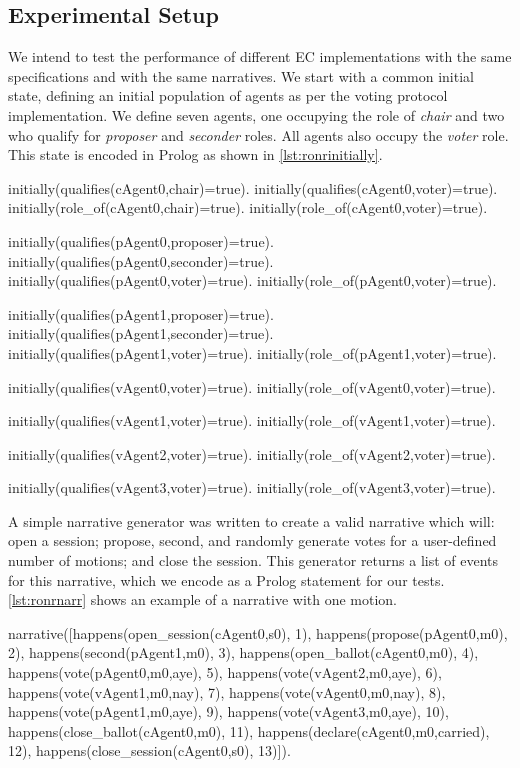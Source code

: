\subsection{Experimental Setup}

We intend to test the performance of different \ac{EC} implementations
with the same specifications and with the same narratives. We start with a
common initial state, defining an initial population of agents as per the voting protocol
implementation. We define seven agents, one occupying the role of \emph{chair}
and two who qualify for \emph{proposer} and \emph{seconder} roles. All agents
also occupy the \emph{voter} role. This state is encoded in Prolog as shown in
\autoref{lst:ronrinitially}.

\begin{prolog}[caption=Initial state of voting protocol in Prolog,label=lst:ronrinitially]
initially(qualifies(cAgent0,chair)=true).
initially(qualifies(cAgent0,voter)=true).
initially(role_of(cAgent0,chair)=true).
initially(role_of(cAgent0,voter)=true).

initially(qualifies(pAgent0,proposer)=true).
initially(qualifies(pAgent0,seconder)=true).
initially(qualifies(pAgent0,voter)=true).
initially(role_of(pAgent0,voter)=true).

initially(qualifies(pAgent1,proposer)=true).
initially(qualifies(pAgent1,seconder)=true).
initially(qualifies(pAgent1,voter)=true).
initially(role_of(pAgent1,voter)=true).

initially(qualifies(vAgent0,voter)=true).
initially(role_of(vAgent0,voter)=true).

initially(qualifies(vAgent1,voter)=true).
initially(role_of(vAgent1,voter)=true).

initially(qualifies(vAgent2,voter)=true).
initially(role_of(vAgent2,voter)=true).

initially(qualifies(vAgent3,voter)=true).
initially(role_of(vAgent3,voter)=true).
\end{prolog}

A simple narrative generator was written to create a valid narrative which
will: open a session; propose, second, and randomly generate
votes for a user-defined number of motions; and close the session. This
generator returns a list of events for this narrative, which we encode as a
Prolog statement for our tests. \autoref{lst:ronrnarr} shows an example of a
narrative with one motion.

\begin{prolog}[caption=Voting protocol narrative with one motion passed,label=lst:ronrnarr]
narrative([happens(open_session(cAgent0,s0), 1),
	happens(propose(pAgent0,m0), 2),
	happens(second(pAgent1,m0), 3),
	happens(open_ballot(cAgent0,m0), 4),
	happens(vote(pAgent0,m0,aye), 5),
	happens(vote(vAgent2,m0,aye), 6),
	happens(vote(vAgent1,m0,nay), 7),
	happens(vote(vAgent0,m0,nay), 8),
	happens(vote(pAgent1,m0,aye), 9),
	happens(vote(vAgent3,m0,aye), 10),
	happens(close_ballot(cAgent0,m0), 11),
	happens(declare(cAgent0,m0,carried), 12),
	happens(close_session(cAgent0,s0), 13)]).
\end{prolog}

